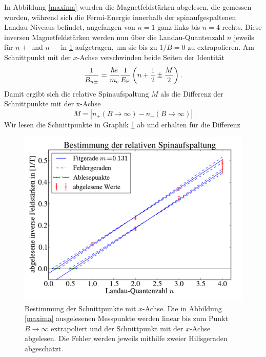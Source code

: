 \documentclass[paper=a4,fontsize=10pt,DIV=18,twocolumn,parskip=half]{scrartcl}
\numberwithin{equation}{section}    %
\begin{document}
In Abbildung \ref{maxima} wurden die Magnetfeldstärken abgelesen, die gemessen wurden, während sich die Fermi-Energie innerhalb der spinaufgespaltenen Landau-Niveaus befindet, angefangen von $n=1$ ganz links bis $n=4$ rechts. Diese inversen Magnetfeldstärken werden nun über die Landau-Quantenzahl $n$ jeweils für $n+$ und $n-$ in \ref{spinaufspaltung} aufgetragen, um sie bis zu $1/B=0$ zu extrapolieren. Am Schnittpunkt mit der $x$-Achse verschwinden beide Seiten der Identität
\begin{equation}
\frac{1}{B_{n\pm}}=\frac{\hbar e}{m_{\rm c}}\frac{1}{E_{\rm F}}\left(n+\frac{1}{2}\pm\frac{M}{2}\right).
\end{equation}
Damit ergibt sich die relative Spinaufspaltung $M$ als die Differenz der Schnittpunkte mit der x-Achse
\begin{equation}
M=|n_+(B\rightarrow \infty)- n_-(B\rightarrow \infty)|
\end{equation}
Wir lesen die Schnittpunkte in Graphik \ref{spinaufspaltung} ab und erhalten für die Differenz
\begin{figure}[]
	\begin{center}
		\includegraphics[width=\columnwidth]{Data-Plots/07-Spinaufspaltung.pdf}
		\caption{Bestimmung der Schnittpunkte mit $x$-Achse. Die in Abbildung \ref{maxima} ausgelesenen Messpunkte werden linear bis zum Punkt $B\rightarrow \infty$ extrapoliert und der Schnittpunkt mit der $x$-Achse abgelesen. Die Fehler werden jeweils mithilfe zweier Hilfsgeraden abgeschätzt.}
		\label{spinaufspaltung}
	\end{center}
\end{figure}
\end{document}

